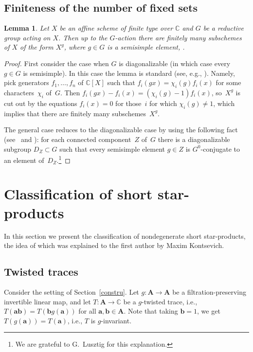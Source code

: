 \documentclass[11pt]{article}
\numberwithin{equation}{section}
\numberwithin{equation}{section}
\newtheorem{Lemma}[Theorem]{Lemma}
\begin{document}
\setcounter{subsection}{5}\setcounter{footnote}{6}
\subsection{Finiteness of the number of fixed sets}

\begin{Lemma}\label{finfix} Let $X$ be an affine scheme of finite type over ${\mathbb C}$ and
$G$ be a reductive group acting on $X$. Then up to the $G$-action there are finitely many subschemes
of $X$ of the form $X^g$, where $g\in G$ is a semisimple element, .
\end{Lemma}

\begin{proof} First consider the case when $G$ is diagonalizable (in which case every $g\in G$ is semisimple). In this case the lemma is standard (see, e.g., \cite[Proposition on p.~44]{Ste}). Namely, pick generators $f_1,\dots,f_n$ of ${\mathbb C}[X]$ such that $f_i(gx)=\chi_i(g)f_i(x)$ for some characters~$\chi_i$ of~$G$. Then $f_i(gx)-f_i(x)=(\chi_i(g)-1)f_i(x)$, so~$X^g$ is cut out by the equations $f_i(x)=0$ for those~$i$ for which $\chi_i(g)\ne 1$, which implies that there are finitely many subschemes~$X^g$.

The general case reduces to the diagonalizable case by using the following fact (see~\cite{Sie} and \cite[Section~1.14]{Lu}): for each connected component~$Z$ of~$G$ there is a diagonalizable subgroup $D_Z\subset G$ such that every semisimple element $g\in Z$ is $G^0$-conjugate to an element of~$D_Z$.\footnote{We are grateful to G.~Lusztig for this explanation.}
\end{proof}

\section{Classification of short star-products}\label{section3}

In this section we present the classification of nondegenerate short star-products, the idea of which was explained to the first author by Maxim Kontsevich.

\subsection{Twisted traces}

Consider the setting of Section~\ref{constru}. Let $g\colon {{\mathbf A}}\to {{\mathbf A}}$ be a filtration-preserving invertible linear map, and let $T\colon {{\mathbf A}}\to {\mathbb C}$ be a $g$-twisted trace, i.e., $T({\mathbf a}{\mathbf b})=T({\mathbf b}g({\mathbf a}))$ for all ${\mathbf a},{\mathbf b}\in {{\mathbf A}}$. Note that taking ${\mathbf b}=1$, we get $T(g({\mathbf a}))=T({\mathbf a})$, i.e., $T$ is $g$-invariant.
\end{document}

